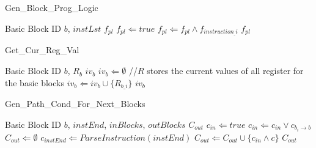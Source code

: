 \documentclass{article}
\begin{document}
\begin{algorithm}
\begin{algorithmic}[1]
\caption{Gen\_Block\_Prog\_Logic}
\REQUIRE Basic Block ID $b$, $instLst$
\ENSURE $f_{pl}$
\STATE $f_{pl} \Leftarrow true$
\STATE $f_{pl} \Leftarrow f_{pl} \wedge f_{instruction_\_i}$
\ENDIF
\ENDFOR
\RETURN $f_{pl}$
\end{algorithmic}
\end{algorithm}

\begin{algorithm}
\begin{algorithmic}[1]
\caption{Get\_Cur\_Reg\_Val}
\REQUIRE Basic Block ID $b$, $R_b$
\ENSURE $iv_b$
\STATE $iv_{b} \Leftarrow\emptyset$
\STATE //$R$ stores the current values of all register for the basic blocks
\STATE $iv_{b} \Leftarrow iv_{b} \cup \{R_{b\_i}\}$ 
\ENDFOR
\RETURN $iv_{b}$
\end{algorithmic}
\end{algorithm}

\begin{algorithm}
\begin{algorithmic}[1]
\caption{Gen\_Path\_Cond\_For\_Next\_Blocks}
\REQUIRE Basic Block ID $b$, $instEnd$, $inBlocks$, $outBlocks$
\ENSURE $C_{out}$
\STATE $c_{in} \Leftarrow true$
\STATE $c_{in} \Leftarrow c_{in} \vee c_{b_i \rightarrow b}$
\ENDFOR
\STATE $C_{out} \Leftarrow \emptyset$
\STATE $c_{instEnd} \Leftarrow Parse Instruction(instEnd)$
\STATE $C_{out} \Leftarrow C_{out} \cup \{c_{in} \wedge c\}$
\ENDFOR
\RETURN $C_{out}$
\end{algorithmic}
\end{algorithm}
\end{document}
